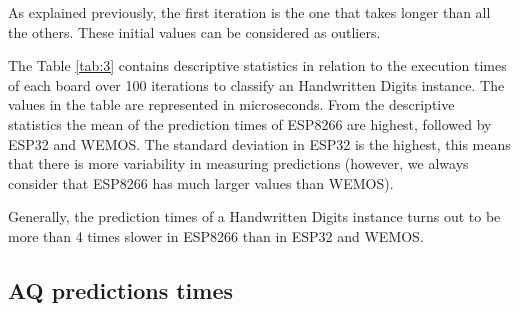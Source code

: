 \documentclass{article}
\begin{document}
As explained previously, the first iteration is the one that takes longer than all the others. These initial values can be considered as outliers.

The Table \ref{tab:3} contains descriptive statistics in relation to the execution times of each board over 100 iterations to classify an Handwritten Digits instance. The values in the table are represented in microseconds. From the descriptive statistics the mean of the prediction times of ESP8266 are highest, followed by ESP32 and WEMOS. The standard deviation in ESP32 is the highest, this means that there is more variability in measuring predictions (however, we always consider that ESP8266 has much larger values than WEMOS).

Generally, the prediction times of a Handwritten Digits instance turns out to be more than 4 times slower in ESP8266 than in ESP32 and WEMOS.

\subsection{AQ predictions times}
\end{document}
